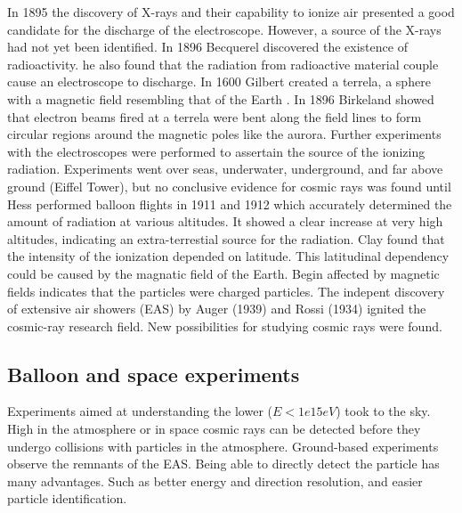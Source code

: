 In 1895 the discovery of X-rays and their capability to ionize air \cite{roentgen1895radiation,flakus1981radiation} presented a good candidate for the discharge of the electroscope. However, a source of the X-rays had not yet been identified. In 1896 Becquerel discovered the existence of radioactivity. he also found that the radiation from radioactive material couple cause an electroscope to discharge. In 1600 Gilbert created a terrela, a sphere with a magnetic field resembling that of the Earth \cite{gilbert1893terrela}. In 1896 Birkeland \cite{birkeland1896aurora} showed that electron beams fired at a terrela were bent along the field lines to form circular regions around the magnetic poles like the aurora. Further experiments with the electroscopes were performed to assertain the source of the ionizing radiation. Experiments went over seas, underwater, underground, and far above ground (Eiffel Tower), but no conclusive evidence for cosmic rays was found until Hess performed balloon flights in 1911 and 1912 which accurately determined the amount of radiation at various altitudes. It showed a clear increase at very high altitudes, indicating an extra-terrestial source for the radiation. Clay found that the intensity of the ionization depended on latitude. This latitudinal dependency could be caused by the magnatic field of the Earth. Begin affected by magnetic fields indicates that the particles were charged particles. The indepent discovery of extensive air showers (EAS) by Auger (1939) \cite{auger1939eas} and Rossi (1934) ignited the cosmic-ray research field. New possibilities for studying cosmic rays were found.


\subsection{Balloon and space experiments}

Experiments aimed at understanding the lower ($E < 1e15eV$) took to the sky. High in the atmosphere or in space cosmic rays can be detected before they undergo collisions with particles in the atmosphere. Ground-based experiments observe the remnants of the EAS. Being able to directly detect the particle has many advantages. Such as better energy and direction resolution, and easier particle identification.

